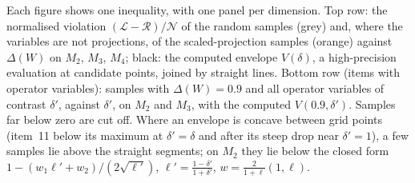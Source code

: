 \documentclass[11pt]{article}
\newcommand{\cL}{\mathcal{L}}
\newcommand{\cR}{\mathcal{R}}
\newcommand{\cN}{\mathcal{N}}
\theoremstyle{plain}
\theoremstyle{definition}
\theoremstyle{remark}
\begin{document}
Each figure shows one inequality, with one panel per dimension. Top row: the normalised violation $(\cL-\cR)/\cN$
of the random samples (grey) and, where the variables are not projections, of the
scaled-projection samples (orange) against $\Delta(W)$ on $M_2$, $M_3$, $M_4$; black: the computed envelope $V(\delta)$,
a high-precision evaluation at candidate points, joined by straight lines. Bottom row (items with operator variables): samples
with $\Delta(W)=0.9$ and all operator variables of contrast $\delta'$, against $\delta'$, on $M_2$ and $M_3$, with the
computed $V(0.9,\delta')$. Samples far below zero are cut off. Where an envelope is concave between grid points (item~11
below its maximum at $\delta'=\delta$ and after its steep drop near $\delta'=1$), a few samples lie above the straight
segments; on $M_2$ they lie below the closed form $1-(w_1\ell'+w_2)/(2\sqrt{\ell'})$, $\ell'=\frac{1-\delta'}{1+\delta'}$,
$w=\frac{2}{1+\ell}(1,\ell)$.


\end{document}
